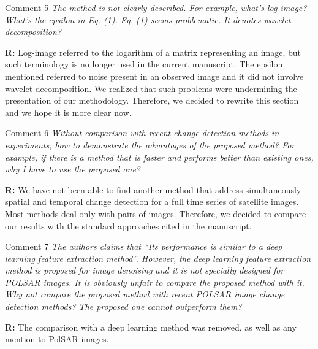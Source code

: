 \documentclass[11pt]{report}
\begin{document}
\medskip
\begin{mybox}{Comment 5}
\textit{The method is not clearly described. For example, what’s log-image? What’s the epsilon in Eq. (1). Eq. (1) seems
problematic. It denotes wavelet decomposition?}


\medskip
\textbf{R:} Log-image referred to the logarithm of a matrix representing an image, but such terminology is no longer used in the current manuscript. The epsilon mentioned referred to noise present in an observed image and it did not involve wavelet decomposition. We realized that such problems were undermining the presentation of our methodology. Therefore, we decided to rewrite this section and we hope it is more clear now.

\medskip

\end{mybox}

\vspace{0.3cm}

\medskip
\begin{mybox}{Comment 6}
\textit{Without comparison with recent change detection methods in experiments, how to demonstrate the advantages of the
proposed method? For example, if there is a method that is faster and performs better than existing ones, why I have to
use the proposed one?}


\medskip
\textbf{R:} We have not been able to find another method that address simultaneously spatial and temporal change detection for a full time series of satellite images. Most methods deal only with pairs of images. Therefore, we decided to compare our results with the standard approaches cited in the manuscript.

\medskip

\end{mybox}

\vspace{0.3cm}

\medskip
\begin{mybox}{Comment 7}
\textit{The authors claims that “Its performance is similar to a deep learning feature extraction method”. However, the deep
learning feature extraction method is proposed for image denoising and it is not specially designed for POLSAR images.
It is obviously unfair to compare the proposed method with it. Why not compare the proposed method with recent
POLSAR image change detection methods? The proposed one cannot outperform them?}


\medskip
\textbf{R:} The comparison with a deep learning method was removed, as well as any mention to PolSAR images.

\medskip

\end{mybox}
\end{document}
